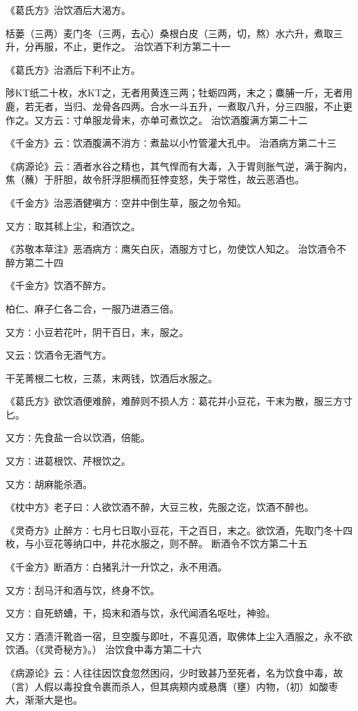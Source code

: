 \documentclass[a4paper,12pt,UTF8,twoside]{ctexbook}
\begin{document}
《葛氏方》治饮酒后大渴方。

栝蒌（三两）麦门冬（三两，去心）桑根白皮（三两，切，熬）水六升，煮取三升，分再服，不止，更作之。
治饮酒下利方第二十一

《葛氏方》治酒后下利不止方。

陟KT纸二十枚，水KT之，无者用黄连三两；牡蛎四两，末之；麋脯一斤，无者用鹿，若无者，当归、龙骨各四两。合水一斗五升，一煮取八升，分三四服，不止更作之。又方云∶寸单服龙骨末，亦单可煮饮之。
治饮酒腹满方第二十二

《千金方》云∶饮酒腹满不消方∶煮盐以小竹管灌大孔中。
治酒病方第二十三

《病源论》云∶酒者水谷之精也，其气悍而有大毒，入于胃则胀气逆，满于胸内，焦（蘸）于肝胆，故令肝浮胆横而狂悖变怒，失于常性，故云恶酒也。

《千金方》治恶酒健嗔方∶空井中倒生草，服之勿令知。

又方∶取其秫上尘，和酒饮之。

《苏敬本草注》恶酒病方∶鹰矢白灰，酒服方寸匕，勿使饮人知之。
治饮酒令不醉方第二十四

《千金方》饮酒不醉方。

柏仁、麻子仁各二合，一服乃进酒三倍。

又方∶小豆若花叶，阴干百日，末，服之。

又云∶饮酒令无酒气方。

干芜菁根二七枚，三蒸，末两钱，饮酒后水服之。

《葛氏方》欲饮酒便难醉，难醉则不损人方∶葛花并小豆花，干末为散，服三方寸匕。

又方∶先食盐一合以饮酒，倍能。

又方∶进葛根饮、芹根饮之。

又方∶胡麻能杀酒。

《枕中方》老子曰∶人欲饮酒不醉，大豆三枚，先服之讫，饮酒不醉也。

《灵奇方》止醉方∶七月七日取小豆花，干之百日，末之。欲饮酒，先取门冬十四枚，与小豆花等纳口中，井花水服之，则不醉。
断酒令不饮方第二十五

《千金方》断酒方∶白猪乳汁一升饮之，永不用酒。

又方∶刮马汗和酒与饮，终身不饮。

又方∶自死蛴螬，干，捣末和酒与饮，永代闻酒名呕吐，神验。

又方∶酒渍汗靴沓一宿，旦空腹与即吐，不喜见酒，取佛体上尘入酒服之，永不欲饮酒。（《灵奇秘方》。）
治饮食中毒方第二十六

《病源论》云∶人往往因饮食忽然困闷，少时致甚乃至死者，名为饮食中毒，故（言）人假以毒投食令裹而杀人，但其病颊内或悬膺（壅）内物，（初）如酸枣大，渐渐大是也。
\end{document}
